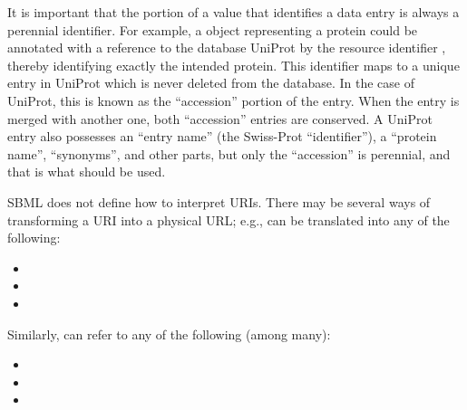 It is important that the portion of a  value
that identifies a data entry is always a perennial identifier.
For example, a \Species object representing a protein could be
annotated with a reference to the database UniProt by the resource
identifier , thereby identifying
exactly the intended protein.  This identifier maps to a unique
entry in UniProt which is never deleted from the database.  In the
case of UniProt, this is known as the ``accession'' portion of the
entry.  When the entry is merged with another one, both
``accession'' entries are conserved.  A UniProt entry also
possesses an ``entry name'' (the Swiss-Prot ``identifier''), a
``protein name'', ``synonyms'', and other parts, but only the
``accession'' is perennial, and that is what should be used.

SBML does not define how to interpret URIs.  There may be several
ways of transforming a URI into a physical URL; e.g.,
 can be translated into any
of the following:
\begin{itemize}\setlength{\parskip}{-0.7ex}

\item {}
\item {}
\item {}

\end{itemize}
\vspace*{-1ex}

Similarly,  can refer to
any of the following (among many):
\begin{itemize}\setlength{\parskip}{-0.7ex}

\item {}
\item {}
\item {}

\end{itemize}\vspace*{-1ex}

